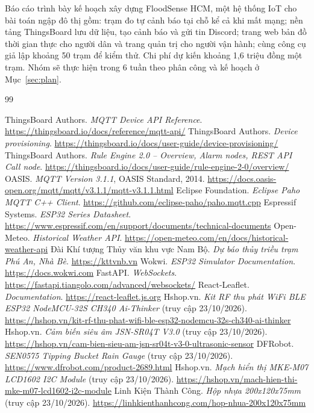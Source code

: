 \documentclass[12pt,a4paper]{article}
\begin{document}
Báo cáo trình bày kế hoạch xây dựng FloodSense HCM, một hệ thống IoT cho bài toán ngập đô thị gồm: trạm đo tự cảnh báo tại chỗ kể cả khi mất mạng; nền tảng ThingsBoard lưu dữ liệu, tạo cảnh báo và gửi tin Discord; trang web bản đồ thời gian thực cho người dân và trang quản trị cho người vận hành; cùng công cụ giả lập khoảng 50 trạm để kiểm thử. Chi phí dự kiến khoảng 1,6 triệu đồng một trạm. Nhóm sẽ thực hiện trong 6 tuần theo phân công và kế hoạch ở Mục~\ref{sec:plan}.

\begin{thebibliography}{99}
\setlength{\itemsep}{2pt}
 ThingsBoard Authors. \textit{MQTT Device API Reference}. \url{https://thingsboard.io/docs/reference/mqtt-api/}
 ThingsBoard Authors. \textit{Device provisioning}. \url{https://thingsboard.io/docs/user-guide/device-provisioning/}
 ThingsBoard Authors. \textit{Rule Engine 2.0 -- Overview, Alarm nodes, REST API Call node}. \url{https://thingsboard.io/docs/user-guide/rule-engine-2-0/overview/}
 OASIS. \textit{MQTT Version 3.1.1}, OASIS Standard, 2014. \url{https://docs.oasis-open.org/mqtt/mqtt/v3.1.1/mqtt-v3.1.1.html}
 Eclipse Foundation. \textit{Eclipse Paho MQTT C++ Client}. \url{https://github.com/eclipse-paho/paho.mqtt.cpp}
 Espressif Systems. \textit{ESP32 Series Datasheet}. \url{https://www.espressif.com/en/support/documents/technical-documents}
 Open-Meteo. \textit{Historical Weather API}. \url{https://open-meteo.com/en/docs/historical-weather-api}
 Đài Khí tượng Thủy văn khu vực Nam Bộ. \textit{Dự báo thủy triều trạm Phú An, Nhà Bè}. \url{https://kttvnb.vn}
 Wokwi. \textit{ESP32 Simulator Documentation}. \url{https://docs.wokwi.com}
 FastAPI. \textit{WebSockets}. \url{https://fastapi.tiangolo.com/advanced/websockets/}
 React-Leaflet. \textit{Documentation}. \url{https://react-leaflet.js.org}
 Hshop.vn. \textit{Kit RF thu phát WiFi BLE ESP32 NodeMCU-32S CH340 Ai-Thinker} (truy cập 23/10/2026). \url{https://hshop.vn/kit-rf-thu-phat-wifi-ble-esp32-nodemcu-32s-ch340-ai-thinker}
 Hshop.vn. \textit{Cảm biến siêu âm JSN-SR04T V3.0} (truy cập 23/10/2026). \url{https://hshop.vn/cam-bien-sieu-am-jsn-sr04t-v3-0-ultrasonic-sensor}
 DFRobot. \textit{SEN0575 Tipping Bucket Rain Gauge} (truy cập 23/10/2026). \url{https://www.dfrobot.com/product-2689.html}
 Hshop.vn. \textit{Mạch hiển thị MKE-M07 LCD1602 I2C Module} (truy cập 23/10/2026). \url{https://hshop.vn/mach-hien-thi-mke-m07-lcd1602-i2c-module}
 Linh Kiện Thành Công. \textit{Hộp nhựa 200x120x75mm} (truy cập 23/10/2026). \url{https://linhkienthanhcong.com/hop-nhua-200x120x75mm}
\end{thebibliography}
\end{document}
